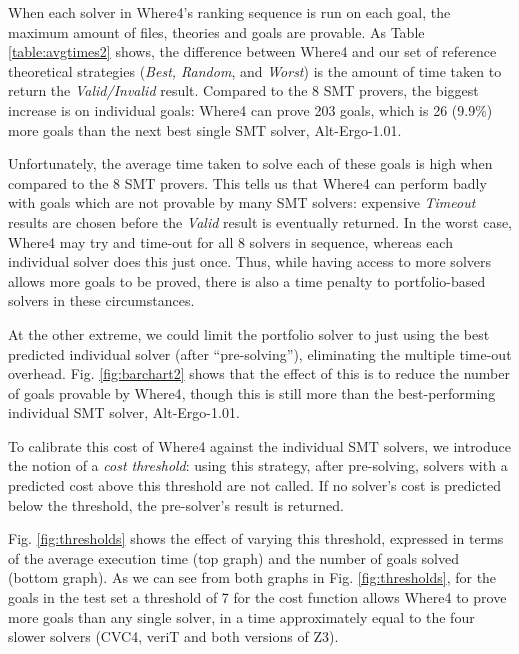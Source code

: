 \documentclass[submission,copyright,creativecommons]{eptcs}
\begin{document}
When each solver in \textsf{Where4}'s ranking sequence is run on each goal, the maximum amount of files, theories and goals are provable. As Table \ref{table:avgtimes2} shows, the difference between \textsf{Where4} and our set of reference theoretical strategies (\textit{Best, Random}, and \textit{Worst}) is the amount of time taken to return the \textit{Valid/Invalid} result. Compared to the 8 SMT provers, the biggest increase is on individual goals: \textsf{Where4} can prove 203 goals, which is 26 (9.9\%) more goals than the next best single SMT solver, Alt-Ergo-1.01.

Unfortunately, the average time taken to solve each of these goals is high when compared to the 8 SMT provers. This tells us that \textsf{Where4} can perform badly with goals which are not provable by many SMT solvers: expensive \textit{Timeout} results are chosen before the \textit{Valid} result is eventually returned.   In the worst case, \textsf{Where4} may try and time-out for all 8 solvers in sequence, whereas each individual solver does this just once.   Thus, while having access to more solvers allows more goals to be proved, there is also a time penalty to portfolio-based solvers in these circumstances.

At the other extreme, we could limit the portfolio solver to just using the best predicted individual solver (after ``pre-solving''), eliminating the multiple time-out overhead.
Fig. \ref{fig:barchart2} shows that the effect of this is to reduce the number of goals provable by \textsf{Where4}, though this is still more than the best-performing individual SMT solver, Alt-Ergo-1.01.

To calibrate this cost of \textsf{Where4} against the individual SMT solvers, we introduce the notion of a \textit{cost threshold}: using this strategy, after pre-solving, solvers with a predicted cost above this threshold are not called. If no solver's cost is predicted below the threshold, the pre-solver's result is returned.  

Fig. \ref{fig:thresholds} shows the effect of varying this threshold, expressed in terms of the average execution time (top graph) and the number of goals solved (bottom graph).  As we can see from both graphs in Fig. \ref{fig:thresholds}, for the goals in the test set a threshold of 7 for the cost function allows \textsf{Where4} to prove more goals than any single solver, in a time approximately equal to the four slower solvers (CVC4, veriT and both versions of Z3). 
\end{document}
